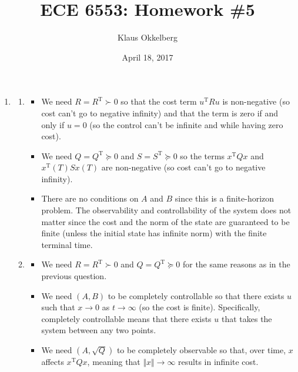 \documentclass[letterpaper,11pt,titlepage]{article}
\newcommand{\trans}{^\text{T}}
\begin{document}
\title{ECE 6553: Homework \#5}
\author{Klaus Okkelberg}
\date{April 18, 2017}
\maketitle


\begin{enumerate}[leftmargin=0pt]

    \item 
        \begin{enumerate}
            \item \begin{itemize}
                \item We need $R=R\trans\succ 0$ so that the cost term $u\trans Ru$ is non-negative (so cost can't go to negative infinity) and that the term is zero if and only if $u=0$ (so the control can't be infinite and while having zero cost).
                \item We need $Q=Q\trans\succcurlyeq 0$ and $S=S\trans\succcurlyeq 0$ so the terms $x\trans Qx$ and $x\trans(T)Sx(T)$ are non-negative (so cost can't go to negative infinity).
                    \item There are no conditions on $A$ and $B$ since this is a finite-horizon problem. The observability and controllability of the system does not matter since the cost and the norm of the state are guaranteed to be finite (unless the initial state has infinite norm) with the finite terminal time.
                \end{itemize}

            \item \begin{itemize}
                \item We need $R=R\trans\succ 0$ and $Q=Q\trans\succcurlyeq 0$ for the same reasons as in the previous question.
                \item We need $(A,B)$ to be completely controllable so that there exists $u$ such that $x\to0$ as $t\to\infty$ (so the cost is finite). Specifically, completely controllable means that there exists $u$ that takes the system between any two points.
                \item We need $(A,\sqrt{Q})$ to be completely observable so that, over time, $x$ affects $x\trans Qx$, meaning that $\Vert x\Vert\to\infty$ results in infinite cost.
            \end{itemize}


\end{enumerate}
\end{enumerate}
\end{document}
